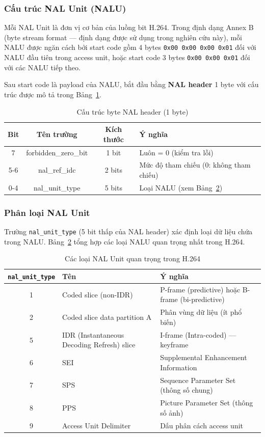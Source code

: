 \subsubsection{Cấu trúc NAL Unit (NALU)}

Mỗi NAL Unit là đơn vị cơ bản của luồng bit H.264. Trong định dạng Annex B (byte stream format --- định dạng được sử dụng trong nghiên cứu này), mỗi NALU được ngăn cách bởi start code gồm 4 bytes \texttt{0x00 0x00 0x00 0x01} đối với NALU đầu tiên trong access unit, hoặc start code 3 bytes \texttt{0x00 0x00 0x01} đối với các NALU tiếp theo.

Sau start code là payload của NALU, bắt đầu bằng \textbf{NAL header} 1 byte với cấu trúc được mô tả trong Bảng~\ref{tab:nal_header}.

\begin{table}[H]
\centering
\caption{Cấu trúc byte NAL header (1 byte)}
\label{tab:nal_header}
\begin{tabular}{|c|c|c|l|}
\hline
Bit & Tên trường & Kích thước & Ý nghĩa \\
\hline
7   & forbidden\_zero\_bit  & 1 bit  & Luôn = 0 (kiểm tra lỗi) \\
\hline
5-6 & nal\_ref\_idc         & 2 bits & Mức độ tham chiếu (0: không tham chiếu) \\
\hline
0-4 & nal\_unit\_type       & 5 bits & Loại NALU (xem Bảng~\ref{tab:nal_types}) \\
\hline
\end{tabular}
\end{table}

\subsubsection{Phân loại NAL Unit}

Trường \texttt{nal\_unit\_type} (5 bit thấp của NAL header) xác định loại dữ liệu chứa trong NALU. Bảng~\ref{tab:nal_types} tổng hợp các loại NALU quan trọng nhất trong H.264.

\begin{table}[ht]
\centering
\caption{Các loại NAL Unit quan trọng trong H.264}
\label{tab:nal_types}
\begin{tabular}{|c|l|l|}
\hline
\texttt{nal\_unit\_type} & Tên & Ý nghĩa \\
\hline
1 & Coded slice (non-IDR) & P-frame (predictive) hoặc B-frame (bi-predictive) \\
\hline
2 & Coded slice data partition A & Phân vùng dữ liệu (ít phổ biến) \\
\hline
5 & IDR (Instantaneous Decoding Refresh) slice & I-frame (Intra-coded) --- keyframe \\
\hline
6 & SEI                   & Supplemental Enhancement Information \\
\hline
7 & SPS                   & Sequence Parameter Set (thông số chung) \\
\hline
8 & PPS                   & Picture Parameter Set (thông số ảnh) \\
\hline
9 & Access Unit Delimiter & Dấu phân cách access unit \\
\hline
\end{tabular}
\end{table}

